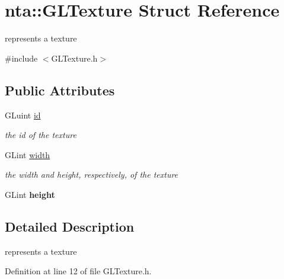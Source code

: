 \hypertarget{structnta_1_1GLTexture}{}\section{nta\+:\+:G\+L\+Texture Struct Reference}
\label{structnta_1_1GLTexture}


represents a texture  




{\ttfamily \#include $<$G\+L\+Texture.\+h$>$}

\subsection*{Public Attributes}
\begin{DoxyCompactItemize}
\item 
\mbox{\label{structnta_1_1GLTexture_aaf0d536088f4b1062d996679b217c0f9}} 
G\+Luint \hyperlink{structnta_1_1GLTexture_aaf0d536088f4b1062d996679b217c0f9}{id}
\begin{DoxyCompactList}\small\item\em the id of the texture \end{DoxyCompactList}\item 
\mbox{\label{structnta_1_1GLTexture_a8f4d13ab2b19b700f76334c46458ac48}} 
G\+Lint \hyperlink{structnta_1_1GLTexture_a8f4d13ab2b19b700f76334c46458ac48}{width}
\begin{DoxyCompactList}\small\item\em the width and height, respectively, of the texture \end{DoxyCompactList}\item 
\mbox{\label{structnta_1_1GLTexture_a4ac2e45733ffb16238eb696d663e62a1}} 
G\+Lint {\bfseries height}
\end{DoxyCompactItemize}


\subsection{Detailed Description}
represents a texture 

Definition at line 12 of file G\+L\+Texture.\+h.



